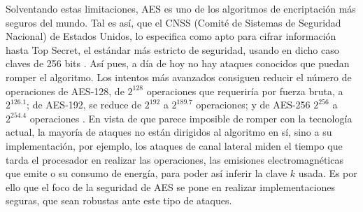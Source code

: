     Solventando estas limitaciones, AES es uno de los algoritmos de encriptación más seguros del mundo. Tal es así, que el CNSS (Comité de Sistemas de Seguridad Nacional) de Estados Unidos, lo especifica como apto para cifrar información hasta Top Secret, el estándar más estricto de seguridad, usando en dicho caso claves de 256 bits \cite{cnssp15_2016}. Así pues, a día de hoy no hay ataques conocidos que puedan romper el algoritmo. Los intentos más avanzados consiguen reducir el número de operaciones de AES-128, de $2^{128}$ operaciones que requeriría por fuerza bruta, a $2^{126.1}$; de AES-192, se reduce de $2^{192}$ a $2^{189.7}$ operaciones; y de AES-256 $2^{256}$ a $2^{254.4}$ operaciones \cite{bogdanov2011biclique}. En vista de que parece imposible de romper con la tecnología actual, la mayoría de ataques no están dirigidos al algoritmo en sí, sino a su implementación, por ejemplo, los ataques de canal lateral miden el tiempo que tarda el procesador en realizar las operaciones, las emisiones electromagnéticas que emite o su consumo de energía, para poder así inferir la clave $k$ usada. Es por ello que el foco de la seguridad de AES se pone en realizar implementaciones seguras, que sean robustas ante este tipo de ataques.


